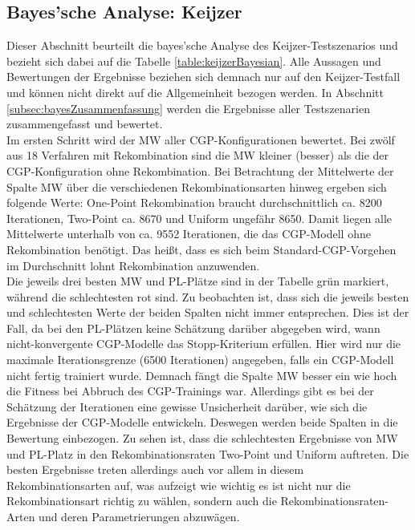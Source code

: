 \subsection{Bayes'sche Analyse: Keijzer}
\label{subsec:bayesKeijzer}

Dieser Abschnitt beurteilt die bayes'sche Analyse des Keijzer-Testszenarios und bezieht sich dabei auf die Tabelle \ref{table:keijzerBayesian}.
Alle Aussagen und Bewertungen der Ergebnisse beziehen sich demnach nur auf den Keijzer-Testfall und können nicht direkt auf die Allgemeinheit bezogen werden.
In Abschnitt \ref{subsec:bayesZusammenfassung} werden die Ergebnisse aller Testszenarien zusammengefasst und bewertet.\\
Im ersten Schritt wird der MW aller CGP-Konfigurationen bewertet.
Bei zwölf aus 18 Verfahren mit Rekombination sind die MW kleiner (besser) als die der CGP-Konfiguration ohne Rekombination.
Bei Betrachtung der Mittelwerte der Spalte MW über die verschiedenen Rekombinationsarten hinweg ergeben sich folgende Werte: One-Point Rekombination braucht durchschnittlich ca. 8200 Iterationen, Two-Point ca. 8670 und Uniform ungefähr 8650.
Damit liegen alle Mittelwerte unterhalb von ca. 9552 Iterationen, die das CGP-Modell ohne Rekombination benötigt.
Das heißt, dass es sich beim Standard-CGP-Vorgehen im Durchschnitt lohnt Rekombination anzuwenden.\\
Die jeweils drei besten MW und PL-Plätze sind in der Tabelle grün markiert, während die schlechtesten rot sind.
Zu beobachten ist, dass sich die jeweils besten und schlechtesten Werte der beiden Spalten nicht immer entsprechen.
Dies ist der Fall, da bei den PL-Plätzen keine Schätzung darüber abgegeben wird, wann nicht-konvergente CGP-Modelle das Stopp-Kriterium erfüllen. 
Hier wird nur die maximale Iterationsgrenze (6500 Iterationen) angegeben, falls ein CGP-Modell nicht fertig trainiert wurde.
Demnach fängt die Spalte MW besser ein wie hoch die Fitness bei Abbruch des CGP-Trainings war.
Allerdings gibt es bei der Schätzung der Iterationen eine gewisse Unsicherheit darüber, wie sich die Ergebnisse der CGP-Modelle entwickeln.
Deswegen werden beide Spalten in die Bewertung einbezogen.
Zu sehen ist, dass die schlechtesten Ergebnisse von MW und PL-Platz in den Rekombinationsraten Two-Point und Uniform auftreten.
Die besten Ergebnisse treten allerdings auch vor allem in diesem Rekombinationsarten auf, was aufzeigt wie wichtig es ist nicht nur die Rekombinationsart richtig zu wählen, sondern auch die Rekombinationsraten-Arten und deren Parametrierungen abzuwägen.\\
